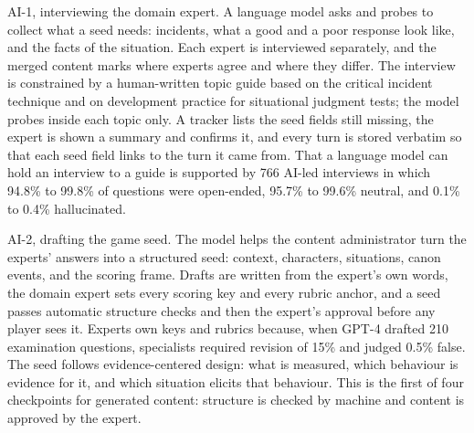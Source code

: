 AI-1, interviewing the domain expert. A language model asks and probes to collect what a seed needs: incidents, what a good and a poor response look like, and the facts of the situation. Each expert is interviewed separately, and the merged content marks where experts agree and where they differ. The interview is constrained by a human-written topic guide based on the critical incident technique\cite{r26} and on development practice for situational judgment tests\cite{r27}; the model probes inside each topic only. A tracker lists the seed fields still missing, the expert is shown a summary and confirms it, and every turn is stored verbatim so that each seed field links to the turn it came from. That a language model can hold an interview to a guide is supported by 766 AI-led interviews in which 94.8\% to 99.8\% of questions were open-ended, 95.7\% to 99.6\% neutral, and 0.1\% to 0.4\% hallucinated\cite{r115}.

AI-2, drafting the game seed. The model helps the content administrator turn the experts' answers into a structured seed: context, characters, situations, canon events, and the scoring frame. Drafts are written from the expert's own words, the domain expert sets every scoring key and every rubric anchor, and a seed passes automatic structure checks and then the expert's approval before any player sees it. Experts own keys and rubrics because, when GPT-4 drafted 210 examination questions, specialists required revision of 15\% and judged 0.5\% false\cite{r116}. The seed follows evidence-centered design: what is measured, which behaviour is evidence for it, and which situation elicits that behaviour\cite{r20,r117}. This is the first of four checkpoints for generated content: structure is checked by machine and content is approved by the expert.

